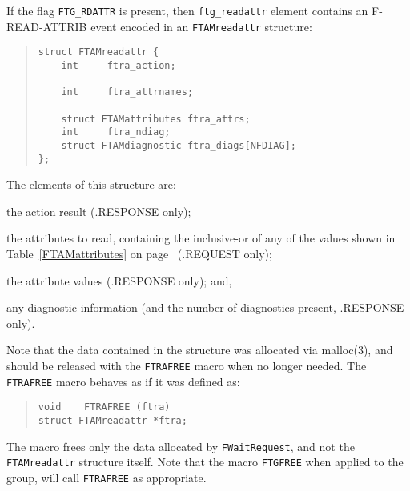 If the flag \verb"FTG_RDATTR" is present,
then \verb"ftg_readattr" element contains an {\sf F-READ-ATTRIB\/} event encoded in an
\verb"FTAMreadattr" structure:
\begin{quote}\small\begin{verbatim}
struct FTAMreadattr {
    int     ftra_action;

    int     ftra_attrnames;

    struct FTAMattributes ftra_attrs;
    int     ftra_ndiag;
    struct FTAMdiagnostic ftra_diags[NFDIAG];
};
\end{verbatim}\end{quote}
The elements of this structure are:
\begin{describe}
\item[\verb"ftra\_action":] the action result ({\sf .RESPONSE\/} only);

\item[\verb"ftra\_attrnames":] the attributes to read,
containing the inclusive-or of any of the values shown in
Table~\ref{FTAMattributes} on page~\pageref{FTAMattributes}
({\sf .REQUEST\/} only);

\item[\verb"ftra\_attrs":] the attribute values
({\sf .RESPONSE\/} only);
and,

\item[\verb"ftra\_diags"/\verb"ftra\_ndiag":] any diagnostic information
(and the number of diagnostics present, {\sf .RESPONSE\/} only).
\end{describe}
Note that the data contained in the structure was allocated via \man malloc(3),
and should be released with the \verb"FTRAFREE" macro when no longer needed.
The \verb"FTRAFREE" macro
behaves as if it was defined as:
\begin{quote}\small\begin{verbatim}
void    FTRAFREE (ftra)
struct FTAMreadattr *ftra;
\end{verbatim}\end{quote}
The macro frees only the data allocated by \verb"FWaitRequest",
and not the \verb"FTAMreadattr" structure itself.
Note that the macro \verb"FTGFREE" when applied to the group,
will call \verb"FTRAFREE" as appropriate.

